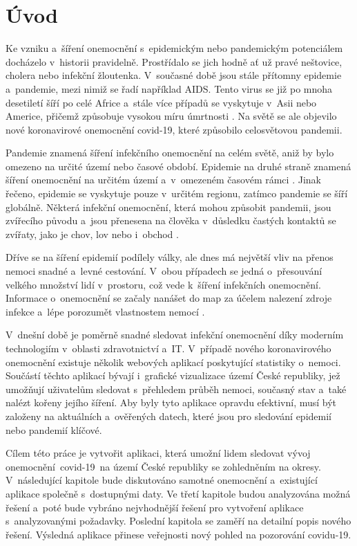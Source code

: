 \chapter{Úvod}
\label{sec:Introduction}

Ke vzniku a~šíření onemocnění s~epidemickým nebo pandemickým potenciálem docházelo v~historii pravidelně. Prostřídalo se jich hodně ať už pravé neštovice, cholera nebo infekční žloutenka. V~současné době jsou stále přítomny epidemie a~pandemie, mezi nimiž se řadí například AIDS. Tento virus se již po mnoha desetiletí šíří po celé Africe a~stále více případů se vyskytuje v~Asii nebo Americe, přičemž způsobuje vysokou míru úmrtnosti \cite{pandemie-historie}. Na světě se ale objevilo nové koronavirové onemocnění covid-19, které způsobilo celosvětovou pandemii.

Pandemie znamená šíření infekčního onemocnění na celém světě, aniž by bylo omezeno na určité území nebo časové období. Epidemie na druhé straně znamená šíření onemocnění na určitém území a~v~omezeném časovém rámci \cite{pandemie-definice}. Jinak řečeno, epidemie se vyskytuje pouze v~určitém regionu, zatímco pandemie se šíří globálně. Některá infekční onemocnění, která mohou způsobit pandemii, jsou zvířecího původu a~jsou přenesena na člověka v~důsledku častých kontaktů se zvířaty, jako je chov, lov nebo i~obchod \cite{diseases}.

Dříve se na šíření epidemií podílely války, ale dnes má největší vliv na přenos nemoci snadné a~levné cestování. V~obou případech se jedná o~přesouvání velkého množství lidí v~prostoru, což vede k~šíření infekčních onemocnění. Informace o~onemocnění se začaly nanášet do map za účelem nalezení zdroje infekce a~lépe porozumět vlastnostem nemocí \cite{bednarkova-covid}.

V~dnešní době je poměrně snadné sledovat infekční onemocnění díky moderním technologiím v~oblasti zdravotnictví a~IT. V~případě nového koronavirového onemocnění existuje několik webových aplikací poskytující statistiky o~nemoci. Součástí těchto aplikací bývají i~grafické vizualizace území České republiky, jež umožňují uživatelům sledovat s~přehledem průběh nemoci, současný stav a~také nalézt kořeny jejího šíření. Aby byly tyto aplikace opravdu efektivní, musí být založeny na aktuálních a~ověřených datech, které jsou pro sledování epidemií nebo pandemií klíčové.

Cílem této práce je vytvořit aplikaci, která umožní lidem sledovat vývoj onemocnění~covid-19~na území České republiky se zohledněním na okresy. V~následující kapitole bude diskutováno samotné onemocnění a~existující aplikace společně s~dostupnými daty. Ve třetí kapitole budou analyzována možná řešení a~poté bude vybráno nejvhodnější řešení pro vytvoření aplikace s~analyzovanými požadavky. Poslední kapitola se zaměří na detailní popis nového řešení. Výsledná aplikace přinese veřejnosti nový pohled na pozorování covidu-19.

\endinput